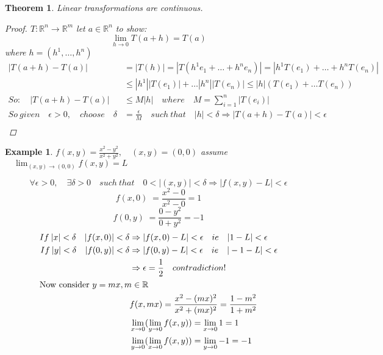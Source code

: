 \documentclass[11pt]{article}
\def\RR{\mathbb{R}}
\newtheorem{theorem}{Theorem}[section]
\newtheorem{example}{Example}[section]
\begin{document}
\begin{theorem}\label{T:Lin trans cont}
Linear transformations are continuous.
\begin{proof}
$T:\RR^{n} \rightarrow \RR^{m}$ let $a \in \RR^{n}$ to show: \[\lim_{h\to 0}T(a+h) = T(a)\] where $h = (h^1 , \dots , h^n )$
\begin{align*}
|T(a+h) - T(a)| & = |T(h)|=|T(h^{1}e_{1}+ \dots +h^{n}e_{n})| =|h^{1}T(e_{1}) + \dots +h^{n}T(e_{n})|\\ 
&\leq  |h^{1}||T(e_{1})|+ \dots |h^{n}||T(e_{n})| \leq |h|(T(e_{1})+ \dots T(e_{n})) \\
So: \quad |T(a+h) - T(a)| &\leq  M|h| \quad where \quad M= \sum_{i=1}^{n}|T(e_i)| \\
So \: given \quad \epsilon > 0,\quad choose \quad \delta &= \frac{\epsilon}{M} \quad such \: that \quad |h|< \delta \Rightarrow |T(a+h) - T(a)|< \epsilon \\
\end{align*}
\end{proof}
\end{theorem}

\begin{example}
$f(x,y)= \frac{x^{2} - y^{2}}{x^{2} +y^{2}}, \quad (x,y)=(0,0)$ assume $\quad \lim_{(x,y) \to (0,0)} f(x,y) = L$

\[\forall \epsilon > 0, \quad  \exists \delta >0  \quad such\: that \quad 0<|(x,y)|<\delta \Rightarrow |f(x,y)-L|<\epsilon \]
\[f(x,0) \;= \frac{x^{2}-0}{x^{2}-0} = 1\]
\[ f(0,y)\;= \frac{0-y^{2}}{0 +y^{2}} = -1\]
\begin{align*}
If \: |x|< \delta \quad |f(x,0)| < \delta & \Rightarrow |f(x,0) - L|< \epsilon \quad ie \quad |1-L|< \epsilon\\
If \: |y|< \delta \quad |f(0,y)| < \delta& \Rightarrow |f(0,y) - L|< \epsilon \quad ie \quad |-1-L|< \epsilon\\
&\Rightarrow \epsilon = \frac{1}{2} \quad contradiction! \\
\shortintertext{Now consider $ y=mx, m \in \RR$}
&f(x,mx)=\frac{x^{2} - (mx)^{2}}{x^{2} + (mx)^{2}} = \frac{1-m^{2}}{1+m^{2}}\\
&\lim_{x \to 0}(\lim_{y \to 0} f(x,y)) = \lim_{x \to 0}1 = 1\\
&\lim_{y \to 0}(\lim_{x \to 0} f(x,y)) = \lim_{y \to 0}-1 = -1\\
\end{align*}
\\

\end{example}
\end{document}
